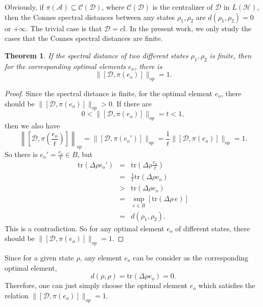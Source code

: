 \documentclass[a4paper,12pt]{article}
\newtheorem{theorem}{Theorem}
\begin{document}
Obviously, if $\pi (\mathcal{A}) \subseteq \mathcal{C} (\mathcal{D})$, where
  $\mathcal{C} (\mathcal{D})$ is the centralizer of $\mathcal{D}$ in $L
  (\mathcal{H})$, then the Connes spectral distances between any states $\rho_1, \rho_2$ are $d (\rho_1, \rho_2) =
  0$ or $+ \infty$.
The trivial case is that $\mathcal{D}= c\mathbb{I}$. In the present work, we
only study the cases that the Connes spectral distances are finite.

\begin{theorem}\cite{Iochum}
  If the spectral distance of two different states $\rho_1, \rho_2$ is finite,
  then for the corresponding optimal elements $e_o$, there is
  \begin{equation}
    \|[\mathcal{D}, \pi (e_o)]\|_{op} = 1.
  \end{equation}
\end{theorem}

\begin{proof}
Since the spectral distance is finite, for the
optimal element $e_o$, there should be $\|[\mathcal{D}, \pi (e_o)]\|_{op} >
0$. If there are
\begin{equation}
  0 < \|[\mathcal{D}, \pi (e_o)]\|_{op} = t < 1,
\end{equation}
then we also have
\begin{equation}
  \left\| \left[ \mathcal{D}, \pi \left( \frac{e_o}{t} \right) \right]
  \right\|_{op} = \|[\mathcal{D}, \pi (e_o')]\|_{op} = \frac{1}{t}
  \|[\mathcal{D}, \pi (e_o)]\|_{op} = 1.
\end{equation}
So there is $e_o' = \frac{e_o}{t} \in B$, but
\begin{eqnarray}
  \mathrm{tr} (\Delta \rho e_o') & = & \mathrm{tr} (\Delta \rho \frac{e_o}{t})
  \nonumber\\
  & = & \frac{1}{t} \mathrm{tr} (\Delta \rho e_o) \nonumber\\
  & > & \mathrm{tr} (\Delta \rho e_o) \nonumber\\
  & = & \sup_{e \in B} [\mathrm{tr} (\Delta \rho \, e)]
  \nonumber\\
  & = & d (\rho_1, \rho_2) . 
\end{eqnarray}
This is a contradiction. So for any optimal element $e_o$ of different states,
there should be $\|[\mathcal{D}, \pi (e_o)]\|_{op} =1$.
\end{proof}

Since for a given state $\rho$, any element $e_o$ can be consider as the
corresponding optimal element,
\begin{equation}
  d (\rho, \rho) = \mathrm{tr} (\Delta \rho e_o) = 0.
\end{equation}
Therefore, one can just simply choose the optimal element $e_o$ which
satisfies the relation $\|[\mathcal{D}, \pi (e_o)]\|_{op} = 1$.
\end{document}
